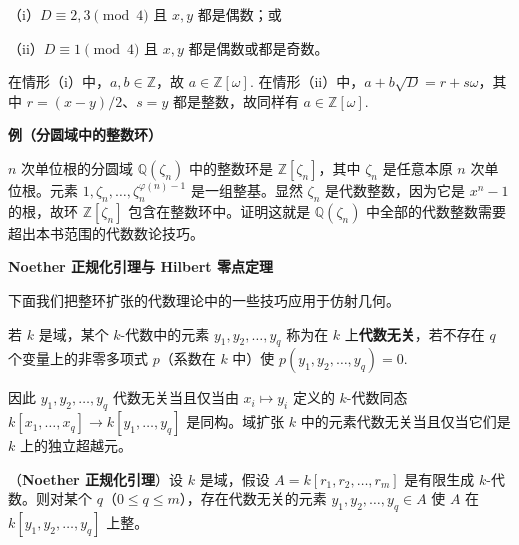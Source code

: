 （i）\(D \equiv 2, 3 \pmod 4\) 且 \(x, y\) 都是偶数；或

（ii）\(D \equiv 1 \pmod 4\) 且 \(x, y\) 都是偶数或都是奇数。

在情形（i）中，\(a, b \in \mathbb{Z}\)，故 \(a \in \mathbb{Z}[\omega]\). 在情形（ii）中，\(a+b\sqrt{D} = r+s\omega\)，其中 \(r = (x-y)/2\)、\(s = y\) 都是整数，故同样有 \(a \in \mathbb{Z}[\omega]\).

\noindent\textbf{例（分圆域中的整数环）}

\(n\) 次单位根的分圆域 \(\mathbb{Q}(\zeta_n)\) 中的整数环是 \(\mathbb{Z}[\zeta_n]\)，其中 \(\zeta_n\) 是任意本原 \(n\) 次单位根。元素 \(1, \zeta_n, \ldots, \zeta_n^{\varphi(n)-1}\) 是一组整基。显然 \(\zeta_n\) 是代数整数，因为它是 \(x^n-1\) 的根，故环 \(\mathbb{Z}[\zeta_n]\) 包含在整数环中。证明这就是 \(\mathbb{Q}(\zeta_n)\) 中全部的代数整数需要超出本书范围的代数数论技巧。

\noindent\textbf{Noether 正规化引理与 Hilbert 零点定理}

下面我们把整环扩张的代数理论中的一些技巧应用于仿射几何。

\begin{definition}
若 \(k\) 是域，某个 \(k\)-代数中的元素 \(y_1, y_2, \ldots, y_q\) 称为在 \(k\) 上\textbf{代数无关}，若不存在 \(q\) 个变量上的非零多项式 \(p\)（系数在 \(k\) 中）使 \(p(y_1, y_2, \ldots, y_q) = 0\).
\end{definition}

因此 \(y_1, y_2, \ldots, y_q\) 代数无关当且仅当由 \(x_i \mapsto y_i\) 定义的 \(k\)-代数同态 \(k[x_1, \ldots, x_q] \to k[y_1, \ldots, y_q]\) 是同构。域扩张 \(k\) 中的元素代数无关当且仅当它们是 \(k\) 上的独立超越元。

\begin{theorem}\label{thm:15.30}
（\textbf{Noether 正规化引理}）设 \(k\) 是域，假设 \(A = k[r_1, r_2, \ldots, r_m]\) 是有限生成 \(k\)-代数。则对某个 \(q\)（\(0 \leq q \leq m\)），存在代数无关的元素 \(y_1, y_2, \ldots, y_q \in A\) 使 \(A\) 在 \(k[y_1, y_2, \ldots, y_q]\) 上整。
\end{theorem}

